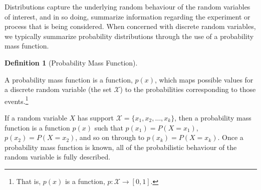 \documentclass[
  letterpaper,
  DIV=11,
  numbers=noendperiod]{scrreprt}
\theoremstyle{definition}
\newtheorem{definition}{Definition}[chapter]
\theoremstyle{definition}
\theoremstyle{definition}
\theoremstyle{remark}
\begin{document}
Distributions capture the underlying random behaviour of the random
variables of interest, and in so doing, summarize information regarding
the experiment or process that is being considered. When concerned with
discrete random variables, we typically summarize probability
distributions through the use of a probability mass function.

\begin{definition}[Probability Mass
Function]\protect\hypertarget{def-probability-mass-function}{}\label{def-probability-mass-function}

A probability mass function is a function, \(p(x)\), which maps possible
values for a discrete random variable (the set \(\mathcal{X}\)) to the
probabilities corresponding to those events.\footnote{That is, \(p(x)\)
  is a function, \(p\colon\mathcal{X}\to[0,1]\).}

\end{definition}

If a random variable \(X\) has support
\(\mathcal{X} = \{x_1,x_2,\dots,x_k\}\), then a probability mass
function is a function \(p(x)\) such that \(p(x_1) = P(X = x_1)\),
\(p(x_2) = P(X = x_2)\), and so on through to \(p(x_k) = P(X=x_k)\).
Once a probability mass function is known, all of the probabilistic
behaviour of the random variable is fully described.
\end{document}
